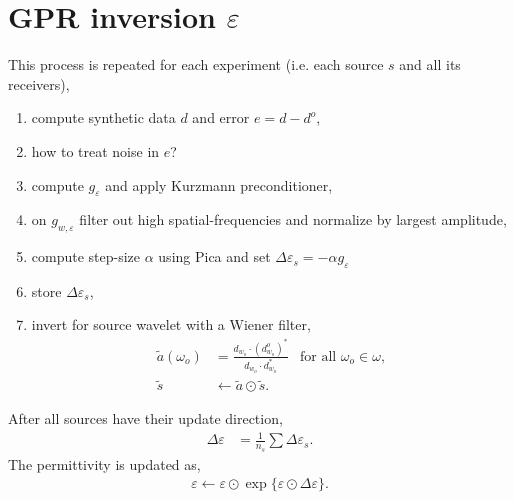 \documentclass[a4paper,12pt]{article}
\begin{document}
\section*{GPR inversion $\varepsilon$}
This process is repeated for each experiment (i.e. each source $s$ and all its receivers),
\begin{enumerate}
\item compute synthetic data $d$ and error $e=d-d^o$,
\item \color{red} how to treat noise in $e$?\color{black}
\item compute $g_{\varepsilon}$ and apply Kurzmann preconditioner,
\item on $g_{w,\varepsilon}$ filter out high spatial-frequencies and normalize by largest amplitude,
\item compute step-size $\alpha$ using Pica and set $\Delta\varepsilon_s=-\alpha g_\varepsilon$
\item store $\Delta\varepsilon_s$,
\item invert for source wavelet with a Wiener filter,
\begin{align*}
\tilde{a}(\omega_o) &= \frac{d_{w_o}\cdot (d_{w_o}^o)^*}{d_{w_o}\cdot d_{w_o}^*} &
\mbox{for all }\omega_o\in\omega,\\
\tilde{s} &\gets \tilde{a}\odot\tilde{s}.
\end{align*}
\end{enumerate}
After all sources have their update direction, 
\begin{align*}
\Delta\varepsilon &= \frac{1}{n_s} \sum\Delta\varepsilon_s.
\end{align*}
The permittivity is updated as,
\begin{align*}
\varepsilon\gets\varepsilon\odot\exp\{\varepsilon\odot\Delta\varepsilon\}.
\end{align*}
% 
\end{document}
